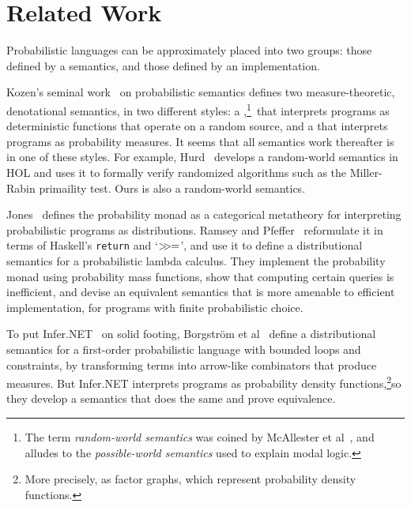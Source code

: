 \documentclass{llncs}
\begin{document}
\section{Related Work}

Probabilistic languages can be approximately placed into two groups: those defined by a semantics, and those defined by an implementation.

\newcommand{\randomworldfootnote}{\footnote{The term \emph{random-world semantics} was coined by McAllester et al~\cite{cit:mcallester-2008tr-random-world}, and alludes to the \emph{possible-world semantics} used to explain modal logic.}}

Kozen's seminal work~\cite{cit:kozen-1979fcs-prob-programs-short} on probabilistic semantics defines two measure-theoretic, denotational semantics, in two different styles: a ,\randomworldfootnote\ that interprets programs as deterministic functions that operate on a random source, and a  that interprets programs as probability measures.
It seems that all semantics work thereafter is in one of these styles.
For example, Hurd~\cite{cit:hurd-2002thesis} develops a random-world semantics in HOL and uses it to formally verify randomized algorithms such as the Miller-Rabin primaility test.
Ours is also a random-world semantics.

Jones~\cite{cit:jones-1990thesis} defines the probability monad as a categorical metatheory for interpreting probabilistic programs as distributions.
Ramsey and Pfeffer~\cite{cit:ramsey-2002popl-stochastic-short} reformulate it in terms of Haskell's \texttt{return} and `${>}\mspace{-6mu}{>}\mspace{-1mu}{=}$', and use it to define a distributional semantics for a probabilistic lambda calculus.
They implement the probability monad using probability mass functions, show that computing certain queries is inefficient, and devise an equivalent semantics that is more amenable to efficient implementation, for programs with finite probabilistic choice.

\newcommand{\factorgraphfootnote}{\footnote{More precisely, as factor graphs, which represent probability density functions.}}

To put Infer.NET~\cite{cit:inferdotnet} on solid footing, Borgstr\"om et al~\cite{cit:borgstrom-2011esop-measure-transformer} define a distributional semantics for a first-order probabilistic language with bounded loops and constraints, by transforming terms into arrow-like combinators that produce measures.
But Infer.NET interprets programs as probability density functions,\factorgraphfootnote so they develop a semantics that does the same and prove equivalence.
\end{document}
